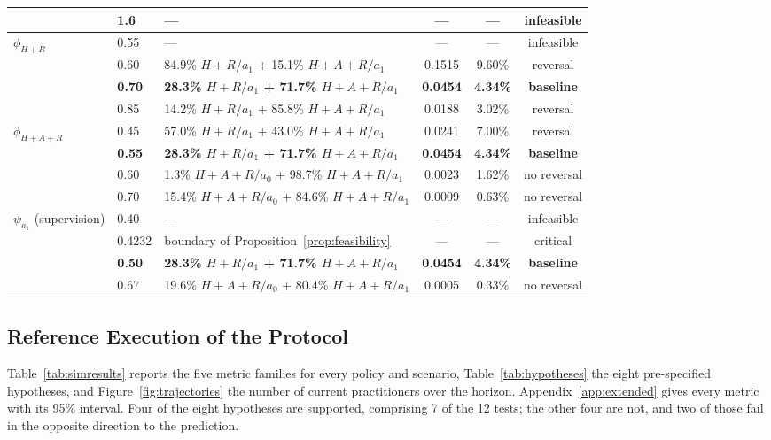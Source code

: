 \documentclass[utf8]{FrontiersinHarvard}
\begin{document}
\begin{table}[!htbp]
\begin{tabularx}{\textwidth}{@{}llXccc@{}}
			& 1.6 & --- & --- & --- & infeasible\\
			\midrule
			\multirow{4}{*}{$\phi_{H+R}$}
			& 0.55 & --- & --- & --- & infeasible\\
			& 0.60 & 84.9\% $H{+}R/a_1$ + 15.1\% $H{+}A{+}R/a_1$ & 0.1515 & 9.60\% & reversal\\
			& \textbf{0.70} & \textbf{28.3\% $H{+}R/a_1$ + 71.7\% $H{+}A{+}R/a_1$} & \textbf{0.0454} & \textbf{4.34\%} & \textbf{baseline}\\
			& 0.85 & 14.2\% $H{+}R/a_1$ + 85.8\% $H{+}A{+}R/a_1$ & 0.0188 & 3.02\% & reversal\\
			\midrule
			\multirow{4}{*}{$\phi_{H+A+R}$}
			& 0.45 & 57.0\% $H{+}R/a_1$ + 43.0\% $H{+}A{+}R/a_1$ & 0.0241 & 7.00\% & reversal\\
			& \textbf{0.55} & \textbf{28.3\% $H{+}R/a_1$ + 71.7\% $H{+}A{+}R/a_1$} & \textbf{0.0454} & \textbf{4.34\%} & \textbf{baseline}\\
			& 0.60 & 1.3\% $H{+}A{+}R/a_0$ + 98.7\% $H{+}A{+}R/a_1$ & 0.0023 & 1.62\% & no reversal\\
			& 0.70 & 15.4\% $H{+}A{+}R/a_0$ + 84.6\% $H{+}A{+}R/a_1$ & 0.0009 & 0.63\% & no reversal\\
			\midrule
			\multirow{4}{*}{$\psi_{a_1}$ (supervision)}
			& 0.40 & --- & --- & --- & infeasible\\
			& 0.4232 & boundary of Proposition~\ref{prop:feasibility} & --- & --- & critical\\
			& \textbf{0.50} & \textbf{28.3\% $H{+}R/a_1$ + 71.7\% $H{+}A{+}R/a_1$} & \textbf{0.0454} & \textbf{4.34\%} & \textbf{baseline}\\
			& 0.67 & 19.6\% $H{+}A{+}R/a_0$ + 80.4\% $H{+}A{+}R/a_1$ & 0.0005 & 0.33\% & no reversal\\
			\bottomrule
		\end{tabularx}
	\end{table}

	\subsection{Reference Execution of the Protocol}
	\label{sec:simresults}

	Table~\ref{tab:simresults} reports the five metric families for every policy and scenario, Table~\ref{tab:hypotheses} the eight pre-specified hypotheses, and Figure~\ref{fig:trajectories} the number of current practitioners over the horizon. Appendix~\ref{app:extended} gives every metric with its 95\% interval. Four of the eight hypotheses are supported, comprising 7 of the 12 tests; the other four are not, and two of those fail in the opposite direction to the prediction.
\end{document}
